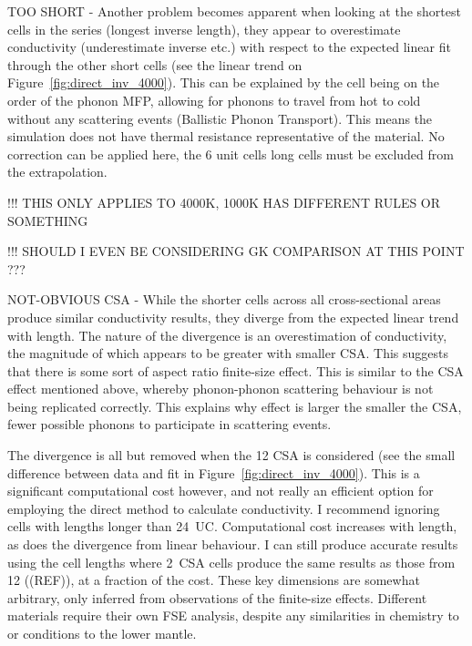 TOO SHORT - Another problem becomes apparent when looking at the shortest cells in the series (longest inverse length), they appear to overestimate conductivity (underestimate inverse etc.) with respect to the expected linear fit through the other short cells (see the linear trend on Figure~\ref{fig:direct_inv_4000}). This can be explained by the cell being on the order of the phonon MFP, allowing for phonons to travel from hot to cold without any scattering events (Ballistic Phonon Transport). This means the simulation does not have thermal resistance representative of the material. No correction can be applied here, the 6 unit cells long cells must be excluded from the extrapolation. %


!!! THIS ONLY APPLIES TO 4000K, 1000K HAS DIFFERENT RULES OR SOMETHING

!!! SHOULD I EVEN BE CONSIDERING GK COMPARISON AT THIS POINT ???

NOT-OBVIOUS CSA - While the shorter cells across all cross-sectional areas produce similar conductivity results, they diverge from the expected linear trend with length. The nature of the divergence is an overestimation of conductivity, the magnitude of which appears to be greater with smaller CSA. This suggests that there is some sort of aspect ratio finite-size effect. This is similar to the CSA effect mentioned above, whereby phonon-phonon scattering behaviour is not being replicated correctly. This explains why effect is larger the smaller the CSA, fewer possible phonons to participate in scattering events. 

The divergence is all but removed when the 12 CSA is considered (see the small difference between data and fit in Figure~\ref{fig:direct_inv_4000}). This is a significant computational cost however, and not really an efficient option for employing the direct method to calculate conductivity. I recommend ignoring cells with lengths longer than 24~UC. Computational cost increases with length, as does the divergence from linear behaviour. I can still produce accurate results using the cell lengths where 2~CSA cells produce the same results as those from 12 ((REF)), at a fraction of the cost. These key dimensions are somewhat arbitrary, only inferred from observations of the finite-size effects. Different materials require their own FSE analysis, despite any similarities in chemistry to \bdg or conditions to the lower mantle.

